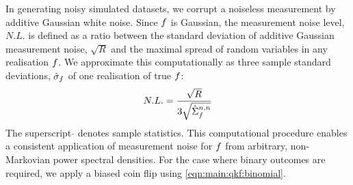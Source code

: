 

In generating noisy simulated datasets, we corrupt a noiseless measurement by additive Gaussian white noise. Since $f$ is Gaussian, the measurement noise level, $N.L.$ is defined as a ratio between the standard deviation of additive Gaussian measurement noise, $\sqrt{R}$ and the maximal spread of random variables in any realisation $f$. We approximate this computationally as three sample standard deviations, $\hat{\sigma}_f$ of one realisation of true $f$:
\begin{align}
N.L. = \frac{\sqrt{R}}{3\sqrt{\hat{\Sigma}_f^{n,n}}}
\end{align}
The superscript $\hat{}$ denotes sample statistics. This computational procedure enables a consistent application of measurement noise for $f$ from arbitrary, non-Markovian power spectral densities. For the case where binary outcomes are required, we apply a biased coin flip using \cref{eqn:main:qkf:binomial}.










